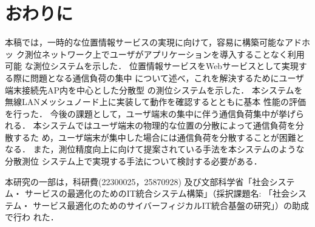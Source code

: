 \documentclass[technicalreport]{ieicej}
\begin{document}
%
%
%

\section{おわりに}
\label{sec:concl}

本稿では，一時的な位置情報サービスの実現に向けて，容易に構築可能なアドホッ
ク測位ネットワーク上でユーザがアプリケーションを導入することなく利用可能
な測位システムを示した．
位置情報サービスをWebサービスとして実現する際に問題となる通信負荷の集中
について述べ，これを解決するためにユーザ端末接続先AP内を中心とした分散型
の測位システムを示した．
本システムを無線LANメッシュノード上に実装して動作を確認するとともに基本
性能の評価を行った．
今後の課題として，ユーザ端末の集中に伴う通信負荷集中が挙げられる．
本システムではユーザ端末の物理的な位置の分散によって通信負荷を分散するた
め，ユーザ端末が集中した場合には通信負荷を分散することが困難となる．
また，測位精度向上に向けて提案されている手法を本システムのような分散測位
システム上で実現する手法について検討する必要がある．

\ack
本研究の一部は，科研費(22300025，25870928) 及び文部科学省「社会システム・
サービスの最適化のためのIT統合システム構築」（採択課題名: 「社会システム・
サービス最適化のためのサイバーフィジカルIT統合基盤の研究」）の助成で行わ
れた．



\end{document}

